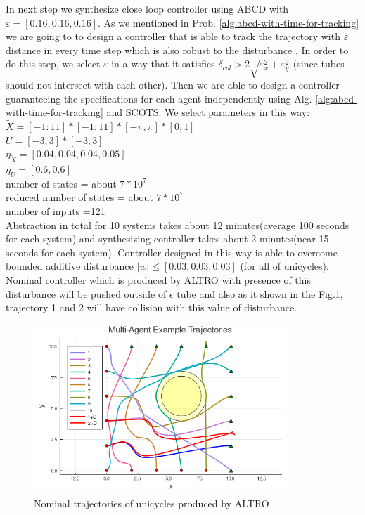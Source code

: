 In next step we synthesize close loop controller using ABCD with $\varepsilon=[0.16,0.16,0.16]$. As we mentioned in Prob. \ref{alg:abcd-with-time-for-tracking} we are going to to design a controller that is able to track the trajectory with $\varepsilon$ distance in every time step which is also robust to the disturbance . In order to do this step, we select $\varepsilon$ in a way that it satisfies $\delta_{col} > 2\sqrt{\varepsilon_x^2+\varepsilon_y^2}$ (since tubes should not intersect with each other). Then we are able to design a controller guaranteeing the specifications for each agent independently using Alg. \ref{alg:abcd-with-time-for-tracking} and SCOTS. We select parameters in this way:\\
$\widetilde{X}=[-1:11]*[-1:11]*[-\pi,\pi]*[0,1]$\\
$U=[-3,3]*[-3,3]$\\
$\eta_{\widetilde{X}}=[0.04,0.04,0.04,0.05]$\\
$\eta_{U}=[0.6,0.6]$\\
number of states = about $7*10^7$\\
reduced number of states = about $7*10^7$\\
number of inputs =121\\

Abstraction in total for 10 systems takes about 12 minutes(average 100 seconds for each system) and synthesizing controller takes about 2 minutes(near 15 seconds for each system). Controller designed in this way is able to overcome bounded additive disturbance $|w|\leq[0.03,0.03,0.03]$ (for all of unicycles). Nominal controller which is produced by ALTRO with presence of this disturbance will be pushed outside of $\epsilon$ tube and also as it shown in the Fig.\ref{fig:MA}, trajectory 1 and 2 will have collision with this value of disturbance. 
\begin{figure}[t]\label{fig:MA}
	\centering
	\includegraphics[width=0.85\textwidth]{figures/MA.png}
	\caption{Nominal trajectories of unicycles produced by ALTRO .}
\end{figure}




